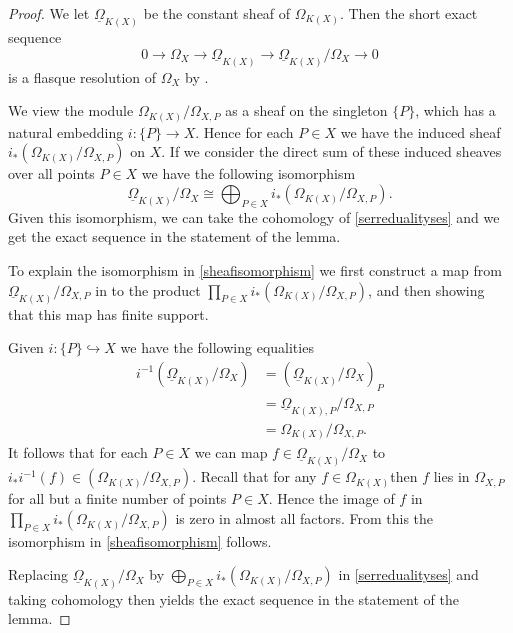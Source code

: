 \documentclass[draft, 11pt]{article} %
\theoremstyle{plain}
\theoremstyle{remark}
\begin{document}
\begin{proof}
We let $\underline{\Omega}_{K(X)}$ be the constant sheaf of $\Omega_{K(X)}$.
Then the short exact sequence
\begin{equation}\label{serredualityses}
0 \rightarrow \Omega_X \rightarrow \underline{\Omega}_{K(X)} \rightarrow \underline{\Omega}_{K(X)}/\Omega_X \rightarrow 0
\end{equation}
is a flasque resolution of $\Omega_X$ by \cite[Chap II, ex. 1.16]{hart}.

We view the module $\Omega_{K(X)}/\Omega_{X,P}$ as a sheaf on the singleton $\{P\}$, which has a natural embedding $i\colon \{P\} \rightarrow X$.
Hence for each $P\in X$ we have the induced sheaf $i_*\left(\Omega_{K(X)}/\Omega_{X,P}\right)$ on $X$.
If we consider the direct sum of these induced sheaves over all points $P\in X$ we have the following isomorphism
\begin{equation}\label{sheafisomorphism}
\underline{\Omega}_{K(X)}/\Omega_X\cong \bigoplus_{P\in X} i_*\left(\Omega_{K(X)}/\Omega_{X,P}\right).
\end{equation}
Given this isomorphism, we can take the cohomology of \eqref{serredualityses} and we get the exact sequence in the statement of the lemma.


To explain the isomorphism in \eqref{sheafisomorphism} we first construct a map from $\underline{\Omega}_{K(X)}/\Omega_{X,P}$ in to the product $\prod_{P \in X} i_*\left(\Omega_{K(X)}/\Omega_{X,P}\right)$, and then showing that this map has finite support.

Given $i\colon \{P\} \hookrightarrow X$ we have the following equalities
\begin{align*}
i^{-1}\left(\underline{\Omega}_{K(X)}/\Omega_X\right) & = \left(\underline{\Omega}_{K(X)}/\Omega_X\right)_P \\
& = \underline{\Omega}_{K(X),P}/\Omega_{X,P} \\
& = \Omega_{K(X)}/\Omega_{X,P}.
\end{align*}
It follows that for each $P \in X$ we can map $f \in \underline{\Omega}_{K(X)}/\Omega_X$ to $i_*i^{-1}(f) \in \left( \Omega_{K(X)}/\Omega_{X,P} \right)$.
Recall that for any $f \in \Omega_{K(X)}$then $f$ lies in $\Omega_{X,P}$ for all but a finite number of points $P \in X$.
Hence the image of $f$ in $\prod_{P \in X} i_*\left(\Omega_{K(X)}/\Omega_{X,P}\right)$ is zero in almost all factors.
From this the isomorphism in \eqref{sheafisomorphism} follows.

Replacing $\underline{\Omega}_{K(X)}/\Omega_X$ by $\bigoplus_{P\in X} i_*\left(\Omega_{K(X)}/\Omega_{X,P}\right)$ in \eqref{serredualityses} and taking cohomology then yields the exact sequence in the statement of the lemma.



\end{proof}
\end{document}
